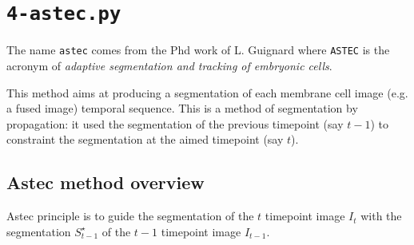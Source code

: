 \section{\texttt{4-astec.py}}
\label{sec:cli:astec}

The name \texttt{astec} comes from the Phd work of L. Guignard \cite{guignard:tel-01278725} where \texttt{ASTEC} is the acronym of \textit{adaptive segmentation and tracking of embryonic cells}.

This method aims at producing a segmentation of each membrane cell image  (e.g. a fused image) temporal sequence. This is a method of segmentation by propagation: it used the segmentation of the previous timepoint (say $t-1$) to constraint the segmentation at the aimed timepoint (say $t$).


\subsection{Astec method overview}

Astec principle is to guide the segmentation of the $t$ timepoint image $I_{t}$ with the segmentation $S^\star_{t-1}$ of the $t-1$ timepoint image $I_{t-1}$.

